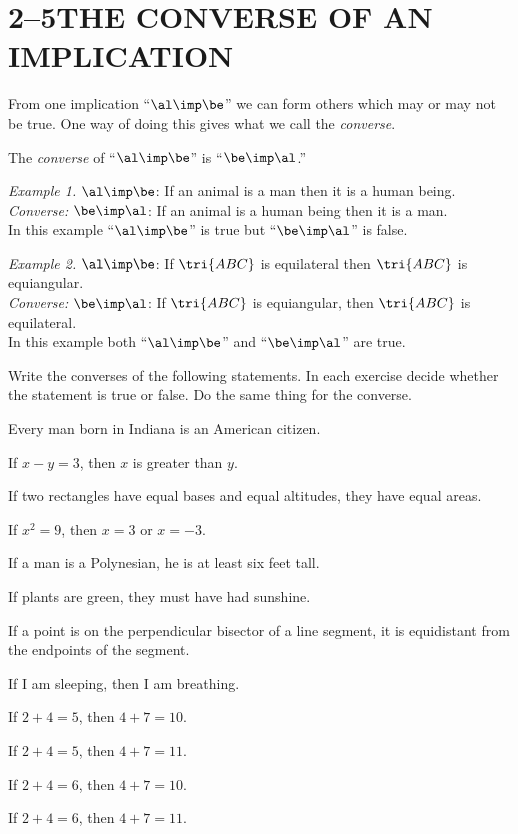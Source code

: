 \documentclass[11pt]{book}
\theoremstyle{bkplain}
\theoremstyle{XIplainnote}
\theoremstyle{bkplain}
\theoremstyle{bkplain}
\begin{document}
\section*{2--5\quad THE CONVERSE OF AN IMPLICATION}

From one implication ``$\al \imp \be$'' we can form others which may or may not be
true. One way of doing this gives what we call the \emph{converse}.

\begin{definition}
The \emph{converse} of ``$\al \imp \be$'' is ``$\be \imp \al$.''
\end{definition}

\emph{Example 1.} $\al \imp \be$: If an animal is a man then it is a human being.\\
\emph{Converse:} $\be \imp \al$: If an animal is a human being then it is a man.\\
In this example ``$\al \imp \be$'' is true but ``$\be \imp \al$'' is false.

\medskip
\emph{Example 2.} $\al \imp \be$: If $\tri{ABC}$ is equilateral then $\tri{ABC}$
is equiangular.\\
\emph{Converse:} $\be \imp \al$: If $\tri{ABC}$ is equiangular, then $\tri{ABC}$
is equilateral.\\
In this example both ``$\al \imp \be$'' and ``$\be \imp \al$'' are true.


Write the converses of the following statements. In each exercise decide whether
the statement is true or false. Do the same thing for the converse.

\begin{exercisecols}
\begin{exlist}
\item Every man born in Indiana is an American citizen.
\item If $x - y = 3$, then $x$ is greater than $y$.
\item If two rectangles have equal bases and equal altitudes, they have equal
      areas.
\item If $x^2 = 9$, then $x = 3$ or $x = -3$.
\item If a man is a Polynesian, he is at least six feet tall.
\item If plants are green, they must have had sunshine.
\item If a point is on the perpendicular bisector of a line segment, it is
      equidistant from the endpoints of the segment.
\item If I am sleeping, then I am breathing.
\item If $2 + 4 = 5$, then $4 + 7 = 10$.
\item If $2 + 4 = 5$, then $4 + 7 = 11$.
\item If $2 + 4 = 6$, then $4 + 7 = 10$.
\item If $2 + 4 = 6$, then $4 + 7 = 11$.
\end{exlist}
\end{exercisecols}
\end{document}
